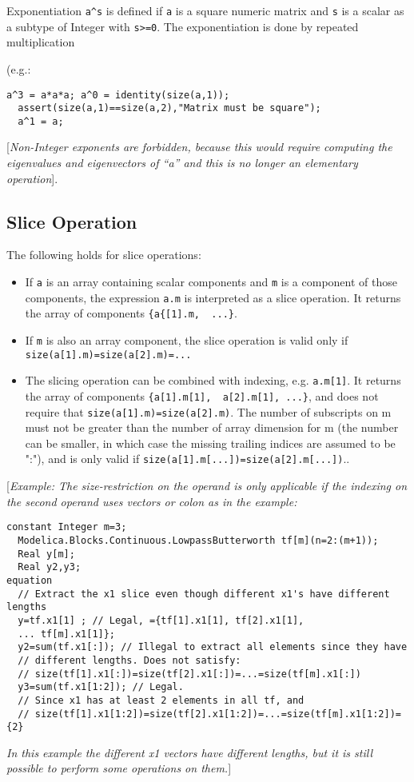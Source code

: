 Exponentiation \lstinline!a^s! is defined if \lstinline!a! is a square numeric matrix and \lstinline!s!
is a scalar as a subtype of Integer with \lstinline!s>=0!. The
exponentiation is done by repeated multiplication

(e.g.:
\begin{lstlisting}[language=modelica]
  a^3 = a*a*a; a^0 = identity(size(a,1));
  assert(size(a,1)==size(a,2),"Matrix must be square");
  a^1 = a;
\end{lstlisting}
{[}\emph{Non-Integer exponents are forbidden, because this would require
computing the eigenvalues and eigenvectors of ``a'' and this is no
longer an elementary operation}{]}.

\subsection{Slice Operation}

The following holds for slice operations:

\begin{itemize}
\item
  If \lstinline!a! is an array containing scalar components and \lstinline!m! is a component of
  those components, the expression \lstinline!a.m! is interpreted as a slice operation. It returns the array of components \lstinline!{a{[1].m,  ...}!.
\item
  If \lstinline!m! is also an array component, the slice operation is valid only if \lstinline!size(a[1].m)=size(a[2].m)=...!
\item
  The slicing operation can be combined with indexing, e.g. \lstinline!a.m[1]!.
  It returns the array of components  \lstinline!{a[1].m[1],  a[2].m[1], ...}!, and does not require that
   \lstinline!size(a[1].m)=size(a[2].m)!. The number of subscripts on m must
  not be greater than the number of array dimension for m (the number
  can be smaller, in which case the missing trailing indices are assumed
  to be ":"), and is only valid if   \lstinline!size(a[1].m[...])=size(a[2].m[...])!..
\end{itemize}

{[}\emph{Example: The size-restriction on the operand is only applicable
if the indexing on the second operand uses vectors or colon as in the
example:}

\begin{lstlisting}[language=modelica]
  constant Integer m=3;
  Modelica.Blocks.Continuous.LowpassButterworth tf[m](n=2:(m+1));
  Real y[m];
  Real y2,y3;
equation
  // Extract the x1 slice even though different x1's have different lengths
  y=tf.x1[1] ; // Legal, ={tf[1].x1[1], tf[2].x1[1],
  ... tf[m].x1[1]};
  y2=sum(tf.x1[:]); // Illegal to extract all elements since they have
  // different lengths. Does not satisfy:
  // size(tf[1].x1[:])=size(tf[2].x1[:])=...=size(tf[m].x1[:])
  y3=sum(tf.x1[1:2]); // Legal.
  // Since x1 has at least 2 elements in all tf, and
  // size(tf[1].x1[1:2])=size(tf[2].x1[1:2])=...=size(tf[m].x1[1:2])={2}
\end{lstlisting}
\emph{In this example the different x1 vectors have different lengths,
but it is still possible to perform some operations on them.}{]}

